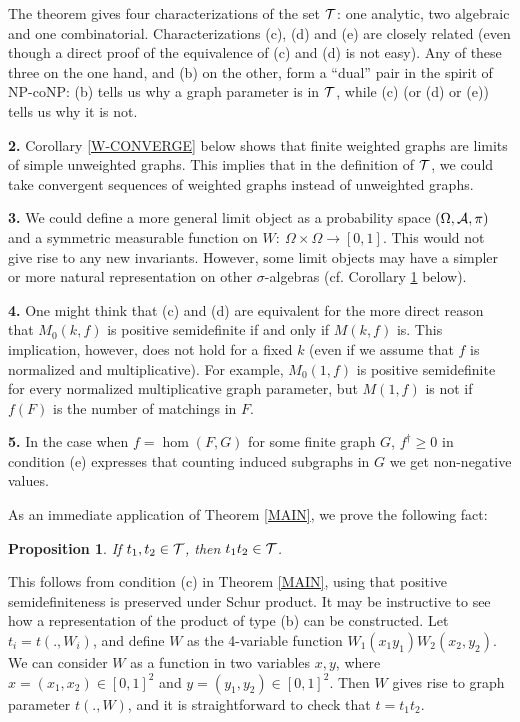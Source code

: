 \documentclass[fleqn]{article}
\newtheorem{prop}[theorem]{Proposition}
\begin{document}
\medskip

 The theorem gives four characterizations of
the set $\TT$: one analytic, two algebraic and one combinatorial.
Characterizations (c), (d) and (e) are closely related (even though a
direct proof of the equivalence of (c) and (d) is not easy). Any of
these three on the one hand, and (b) on the other, form a ``dual''
pair in the spirit of NP-coNP: (b) tells us why a graph parameter is
in $\TT$, while (c) (or (d) or (e)) tells us why it is not.

\medskip

{\bf 2.} Corollary \ref{W-CONVERGE} below shows that finite weighted
graphs are limits of simple unweighted graphs. This implies that in
the definition of $\TT$, we could take convergent sequences of
weighted graphs instead of unweighted graphs.

\medskip

{\bf 3.} We could define a more general limit object as a probability
space $(\Omega,\AA,\pi)$ and a symmetric measurable function on
$W:~\Omega\times\Omega\to[0,1]$. This would not give rise to any new
invariants. However, some limit objects may have a simpler or more
natural representation on other $\sigma$-algebras (cf. Corollary
\ref{W-MULT} below).

\medskip

{\bf 4.} One might think that (c) and (d) are equivalent for the
more direct reason that $M_0(k,f)$ is positive semidefinite if and
only if $M(k,f)$ is. This implication, however, does not hold for
a fixed $k$ (even if we assume that $f$ is normalized and
multiplicative). For example, $M_0(1,f)$ is positive semidefinite
for every normalized multiplicative graph parameter, but $M(1,f)$
is not if $f(F)$ is the number of matchings in $F$.

\medskip

{\bf 5.} In the case when $f=\hom(F,G)$ for some finite graph $G$,
$f^{\dagger}\ge 0$ in condition (e) expresses that counting induced
subgraphs in $G$ we get non-negative values.

\medskip

As an immediate application of Theorem \ref{MAIN}, we prove the
following fact:

\begin{prop}\label{W-MULT}
If $t_1,t_2\in \TT$, then $t_1t_2\in\TT$.
\end{prop}

This follows from condition (c) in Theorem \ref{MAIN}, using that
positive semidefiniteness is preserved under Schur product. It may be
instructive to see how a representation of the product of type (b)
can be constructed. Let $t_i=t(.,W_i)$, and define $W$ as the
4-variable function $W_1(x_1y_1)W_2(x_2,y_2)$. We can consider $W$ as
a function in two variables $x,y$, where $x=(x_1,x_2)\in[0,1]^2$ and
$y=(y_1,y_2)\in[0,1]^2$. Then $W$ gives rise to graph parameter
$t(.,W)$, and it is straightforward to check that $t=t_1t_2$.
\end{document}
